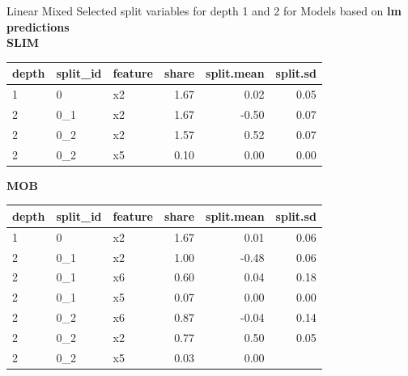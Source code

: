 \documentclass[9pt, xcolor=table]{beamer}
\begin{document}
\begin{frame}{Linear Mixed}
Selected split variables for depth 1 and 2 for Models based on \textbf{lm predictions}\\
\textbf{SLIM}

\begin{table}[ht]
\centering
\begin{tabular}{lllrrr}
  \hline
depth & split\_id & feature & share & split.mean & split.sd \\ 
  \hline
1 & 0 & x2 & 1.67 & 0.02 & 0.05 \\ 
  2 & 0\_1 & x2 & 1.67 & -0.50 & 0.07 \\ 
  2 & 0\_2 & x2 & 1.57 & 0.52 & 0.07 \\ 
  2 & 0\_2 & x5 & 0.10 & 0.00 & 0.00 \\ 
   \hline
\end{tabular}
\end{table}

\textbf{MOB}
\begin{table}[ht]
\centering
\begin{tabular}{lllrrr}
  \hline
depth & split\_id & feature & share & split.mean & split.sd \\ 
  \hline
1 & 0 & x2 & 1.67 & 0.01 & 0.06 \\ 
  2 & 0\_1 & x2 & 1.00 & -0.48 & 0.06 \\ 
  2 & 0\_1 & x6 & 0.60 & 0.04 & 0.18 \\ 
  2 & 0\_1 & x5 & 0.07 & 0.00 & 0.00 \\ 
  2 & 0\_2 & x6 & 0.87 & -0.04 & 0.14 \\ 
  2 & 0\_2 & x2 & 0.77 & 0.50 & 0.05 \\ 
  2 & 0\_2 & x5 & 0.03 & 0.00 &  \\ 
   \hline
\end{tabular}
\end{table}
\end{frame}
\end{document}

